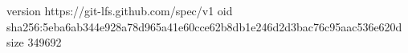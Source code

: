 version https://git-lfs.github.com/spec/v1
oid sha256:5eba6ab344e928a78d965a41e60cce62b8db1e246d2d3bac76c95aac536e620d
size 349692

